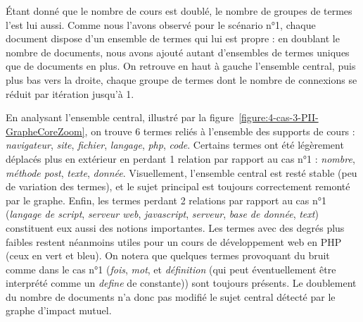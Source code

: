 \bigskip

Étant donné que le nombre de cours est doublé, le nombre de groupes de termes l'est lui aussi.
Comme nous l'avons observé pour le scénario n°1, chaque document dispose d'un ensemble de termes qui lui est propre : en doublant le nombre de documents, nous avons ajouté autant d'ensembles de termes uniques que de documents en plus.
On retrouve en haut à gauche l'ensemble central, puis plus bas vers la droite, chaque groupe de termes dont le nombre de connexions se réduit par itération jusqu'à 1.

\bigskip

En analysant l'ensemble central, illustré par la figure~\ref{figure:4-cas-3-PII-GrapheCoreZoom}, on trouve 6 termes reliés à l'ensemble des supports de cours : \textit{navigateur}, \textit{site}, \textit{fichier}, \textit{langage}, \textit{php}, \textit{code}.
Certains termes ont été légèrement déplacés plus en extérieur en perdant 1 relation par rapport au cas n°1 : \textit{nombre}, \textit{méthode post}, \textit{texte}, \textit{donnée}.
Visuellement, l'ensemble central est resté stable (peu de variation des termes), et le sujet principal est toujours correctement remonté par le graphe.
Enfin, les termes perdant 2 relations par rapport au cas n°1 (\textit{langage de script}, \textit{serveur web}, \textit{javascript}, \textit{serveur}, \textit{base de donnée}, \textit{text}) constituent eux aussi des notions importantes.
Les termes avec des degrés plus faibles restent néanmoins utiles pour un cours de développement web en PHP (ceux en vert et bleu).
On notera que quelques termes provoquant du bruit comme dans le cas n°1 (\textit{fois}, \textit{mot}, et \textit{définition} (qui peut éventuellement être interprété comme un \textit{define} de constante)) sont toujours présents.
Le doublement du nombre de documents n'a donc pas modifié le sujet central détecté par le graphe d'impact mutuel.



